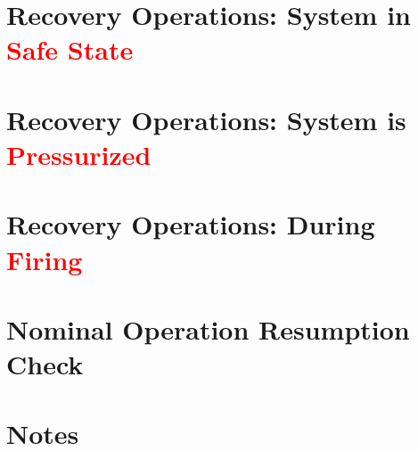 \documentclass{article}
\begin{document}
\newpage

\renewcommand{\thesection}{\arabic{section}}

\setcounter{section}{0}

\section{Recovery Operations: System in \textcolor{red}{Safe State}}


\section{Recovery Operations: System is \textcolor{red}{Pressurized}}


\section{Recovery Operations: During \textcolor{red}{Firing}}


\section{Nominal Operation Resumption Check}


\newpage

\setcounter{section}{0}
\section*{Notes}

\end{document}
